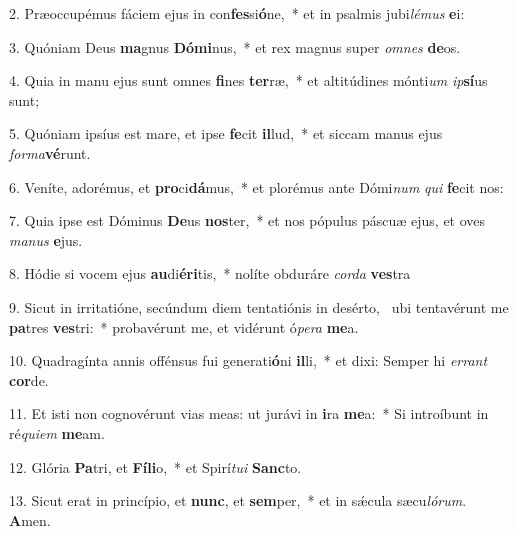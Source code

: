 2. Præoccupémus fáciem ejus in con\textbf{fes}si\textbf{ó}ne,~*  et in psalmis jubi\textit{lé}\textit{mus} \textbf{e}i:\

3. Quóniam Deus \textbf{ma}gnus \textbf{Dó}\textbf{mi}nus,~*  et rex magnus super \textit{om}\textit{nes} \textbf{de}os.\

4. Quia in manu ejus sunt omnes \textbf{fi}nes \textbf{ter}ræ,~*  et altitúdines mónti\textit{um} \textit{ip}\textbf{sí}us sunt;\

5. Quóniam ipsíus est mare, et ipse \textbf{fe}cit \textbf{il}lud,~*  et siccam manus ejus \textit{for}\textit{ma}\textbf{vé}runt.\

6. Veníte, adorémus, et \textbf{pro}ci\textbf{dá}mus,~*  et plorémus ante Dómi\textit{num} \textit{qui} \textbf{fe}cit nos:\

7. Quia ipse est Dóminus \textbf{De}us \textbf{nos}ter,~*  et nos pópulus páscuæ ejus, et oves \textit{ma}\textit{nus} \textbf{e}jus.\

8. Hódie si vocem ejus \textbf{au}di\textbf{é}\textbf{ri}tis,~*  nolíte obduráre \textit{cor}\textit{da} \textbf{ves}tra\

9. Sicut in irritatióne, secúndum diem tentatiónis in desérto, \dag\  ubi tentavérunt me \textbf{pa}tres \textbf{ves}tri:~*  probavérunt me, et vidérunt ó\textit{pe}\textit{ra} \textbf{me}a.\

10. Quadragínta annis offénsus fui generati\textbf{ó}ni \textbf{il}li,~*  et dixi: Semper hi \textit{er}\textit{rant} \textbf{cor}de.\

11. Et isti non cognovérunt vias meas: ut jurávi in \textbf{i}ra \textbf{me}a:~*  Si introíbunt in ré\textit{qui}\textit{em} \textbf{me}am.\

12. Glória \textbf{Pa}tri, et \textbf{Fí}\textbf{li}o,~*  et Spirí\textit{tu}\textit{i} \textbf{Sanc}to.\

13. Sicut erat in princípio, et \textbf{nunc}, et \textbf{sem}per,~*  et in sǽcula sæcu\textit{ló}\textit{rum}. \textbf{A}men.\

